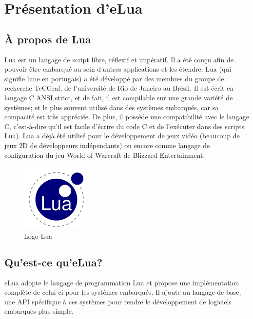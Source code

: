 \chapter[Présentation d’eLua]{Présentation d’eLua}
\label{chap:chap3}

\section{À propos de Lua}

Lua est un langage de script libre, réflexif et impératif. Il a été conçu afin de pouvoir être embarqué au sein d'autres applications et les étendre.
Lua (qui signifie lune en portugais) a été développé par des membres du groupe de recherche TeCGraf, de l'université de Rio de Janeiro au Brésil.
Il est écrit en langage C ANSI strict, et de fait, il est compilable sur une grande variété de systèmes; et le plus souvent utilisé dans des systèmes
embarqués, car sa compacité est très appréciée. De plus, il possède une compatibilité avec le langage C, c'est-à-dire qu'il est facile d'écrire du code
C et de l'exécuter dans des scripts Lua). Lua a déjà été utilisé pour le développement de jeux vidéo (beaucoup de jeux 2D de développeurs indépendants)
ou encore comme langage de configuration du jeu World of Warcraft de Blizzard Entertainment.

\begin{figure}[h]
\begin{center}
\includegraphics[scale=1]{../images/eLua/Lua.JPG}
\caption{Logo Lua}
\end{center}
\end{figure}


\section{Qu'est-ce qu'eLua?}

  eLua adopte le langage de programmation Lua et propose une implémentation complète de celui-ci pour les systèmes embarqués. Il ajoute au langage de base,
une API spécifique à ces systèmes pour rendre le développement de logiciels embarqués plus simple.

